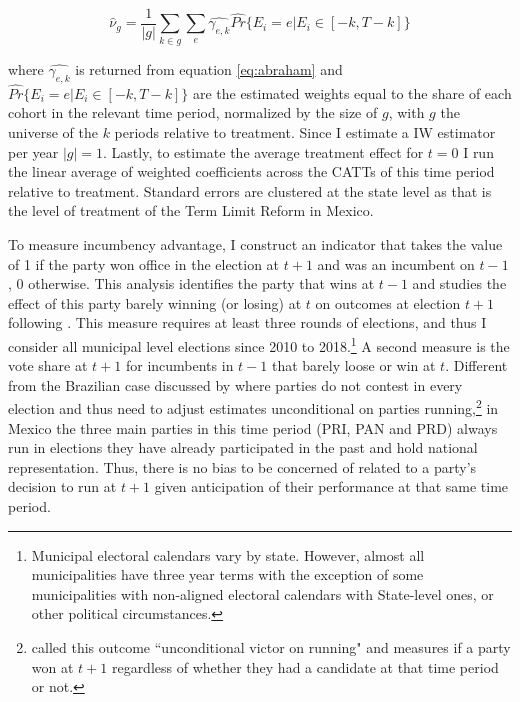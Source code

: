 \documentclass[12pt]{amsart}
\makeatletter
\def\subsection{\@startsection{subsection}{2}
	\z@{.8\linespacing\@plus.7\linespacing}{.7\linespacing}{\large}}
\numberwithin{equation}{section}
\theoremstyle{definition}
\theoremstyle{definition}
\theoremstyle{definition}
\makeatother
\begin{document}
\begin{equation}
\hat{\nu}_g=\frac{1}{|g|}\sum_{k \in g}\sum_e \hat{\gamma_{e,k}} \hat{Pr}\{E_i=e | E_i \in [-k, T-k]\}	
\end{equation}
  
where $\hat{\gamma_{e,k}}$ is returned from equation \ref{eq:abraham} and $\hat{Pr}\{E_i=e | E_i \in [-k, T-k]\}$  are the estimated weights equal to the share of each cohort in the relevant time period, normalized by the size of  $g$, with $g$ the universe of the $k$ periods relative to treatment. Since I estimate a IW estimator per year $|g|=1$. Lastly, to estimate the average treatment effect for $t=0$ I run the linear average of weighted coefficients across the CATTs of this time period relative to treatment.  Standard errors are clustered at the state level as that is the level of treatment of the Term Limit Reform in Mexico. 

\subsection{Data}

To measure incumbency advantage, I construct an indicator that takes the value of 1 if the party won office in the election at $t+1$ and was an incumbent on $t-1$, 0 otherwise. This analysis identifies the party that wins at $t-1$ and studies the effect of this party barely winning (or losing) at $t$ on outcomes at election $t+1$ following \citet{klasnja_titiunik_2017}. This measure requires at least three rounds of elections, and thus I consider all municipal level elections since 2010 to 2018.\footnote{Municipal electoral calendars vary by state. However, almost all municipalities have three year terms with the exception of some municipalities with non-aligned electoral calendars with State-level ones, or other political circumstances.} A second measure is the vote share at $t+1$ for incumbents in $t-1$ that barely loose or win at $t$. Different from the Brazilian case discussed by \citet{klasnja_titiunik_2017} where parties do not contest in every election and thus need to adjust estimates unconditional on parties running,\footnote{\citet{klasnja_titiunik_2017} called this outcome ``unconditional victor on running" and measures if a party won at $t+1$ regardless of whether they had a candidate at that time period or not.} in Mexico the three main parties in this time period (PRI, PAN and PRD) always run in elections they have already participated in the past and hold national representation. Thus, there is no bias to be concerned of related to a party's decision to run at $t+1$ given anticipation of their performance at that same time period.  
\end{document}
